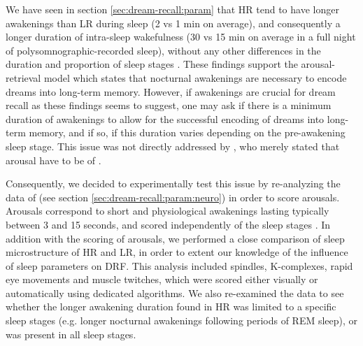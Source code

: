 We have seen in section \ref{sec:dream-recall:param} that HR tend to have longer awakenings than LR during sleep (2 vs 1 min on average), and consequently a longer duration of intra-sleep wakefulness (30 vs 15 min on average in a full night of polysomnographic-recorded sleep), without any other differences in the duration and proportion of sleep stages \citep{eichenlaub_brain_2014}. These findings support the arousal-retrieval model which states that nocturnal awakenings are necessary to encode dreams into long-term memory. However, if awakenings are crucial for dream recall as these findings seems to suggest, one may ask if there is a minimum duration of awakenings to allow for the successful encoding of dreams into long-term memory, and if so, if this duration varies depending on the pre-awakening sleep stage. This issue was not directly addressed by \citet{koulack_dream_1976}, who merely stated that arousal have to be of .

Consequently, we decided to experimentally test this issue by re-analyzing the data of \citet{eichenlaub_brain_2014} (see section \ref{sec:dream-recall:param:neuro}) in order to score arousals. Arousals correspond to short and physiological awakenings lasting typically between 3 and 15 seconds, and scored independently of the sleep stages \citep{american_sleep_disorders_association_eeg_1992, de_gennaro_eeg_2001, bonnet_scoring_2007, bonnet_eeg_2007}. In addition with the scoring of arousals, we performed a close comparison of sleep microstructure of HR and LR, in order to extent our knowledge of the influence of sleep parameters on DRF. This analysis included spindles, K-complexes, rapid eye movements and muscle twitches, which were scored either visually or automatically using dedicated algorithms. We also re-examined the data to see whether the longer awakening duration found in HR was limited to a specific sleep stages (e.g. longer nocturnal awakenings following periods of REM sleep), or was present in all sleep stages.

